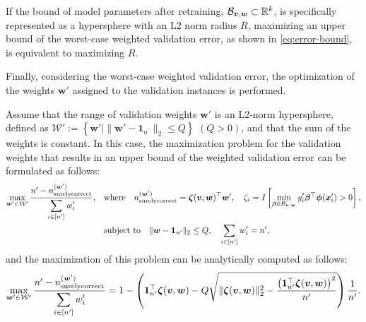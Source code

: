 %
\begin{corollary} \label{cor:R-lb}
	If the bound of model parameters after retraining, ${\cal B}_{\bm{v}, \bm{w}} \subset \mathbb{R}^k$, is specifically represented as a hypersphere with an L2 norm radius $R$, maximizing an upper bound of the worst-case weighted validation error, as shown in \eqref{eq:error-bound}, is equivalent to maximizing $R$.
\end{corollary}

	Finally, considering the worst-case weighted validation error, the optimization of the weights $\bm w'$ assigned to the validation instances is performed.
	\begin{lemma} \label{lem:validation-weight-max}
		Assume that the range of validation weights $\bm w'$ is an L2-norm hypersphere, defined as $\mathcal{W}':=\left\{\boldsymbol{w}' \mid \|\boldsymbol{w}'- \bm 1_{n ^\prime}\|_2 \leq Q\right\}$ $(Q>0)$, and that the sum of the weights is constant. In this case, the maximization problem for the validation weights that results in an upper bound of the weighted validation error can be formulated as follows:
		\begin{align}
			\label{eq:validation-weight-opt}
			\displaystyle \max_{\bm w' \in \cal W'} \frac{n^\prime - {n_{\rm surelycorrect}^{(\bm w')}}}{\displaystyle \sum_{i \in\left[n^ \prime \right]} w_i'}, \quad
			& \text{where} \quad n_{\rm surelycorrect}^{(\bm w')} = \bm\zeta(\bm v, \bm w)^\top \bm w', \quad \zeta_i = I\left[\min_{\bm{\beta} \in {\cal B}_{\bm{v}, \bm{w}}} y_i^{\prime}\bm{\beta}^\top \bm\phi(\bm x^{\prime}_{i}) > 0\right], \\
			& \text{subject to} \quad \|\bm w - \bm 1_{n ^\prime}\|_2 \leq Q, \quad {\displaystyle \sum_{i \in\left[n^ \prime \right]} w_i'} = n^\prime,
		\end{align}
		and the maximization of this problem can be analytically computed as follows:
		\begin{align}
			\displaystyle \max_{\bm w' \in \cal W'} \frac{n^\prime - {n_{\rm surelycorrect}^{(\bm w')}}}{\displaystyle \sum_{i \in\left[n^ \prime \right]} w_i'} = 1 - \left(\bm 1_{n^\prime}^{\top} \bm \zeta(\bm v, \bm w) -Q \sqrt{\|\bm \zeta(\bm v, \bm w)\|_2^2-\frac{\left(\bm 1_{n ^\prime}^{\top} \bm \zeta(\bm v, \bm w) \right)^2}{n^\prime}}\right) \frac{1}{n^\prime}.
		\end{align}
	\end{lemma}
